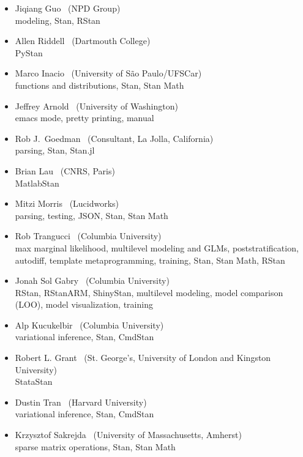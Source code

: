 \begin{itemize}
\\ {\footnotesize chief of optimization, code efficiency, matrix
  algebra, multivariate distributions, \Cpp, Stan, Stan Math, CmdStan}
\item Jiqiang Guo \   (NPD Group)
\\ {\footnotesize modeling, Stan, RStan}
\item Allen Riddell \   (Dartmouth College)
\\ {\footnotesize PyStan}
\item Marco Inacio \   (University of S\~{a}o Paulo/UFSCar)
\\ {\footnotesize functions and distributions, Stan, Stan Math}
\item Jeffrey Arnold \   (University of Washington)
\\ {\footnotesize emacs mode, pretty printing, manual}
\item Rob J.\ Goedman \ (Consultant, La Jolla, California)
\\ {\footnotesize parsing, Stan, Stan.jl}
\item Brian Lau \ (CNRS, Paris)
\\ {\footnotesize MatlabStan}
\item Mitzi Morris \   (Lucidworks)
\\ {\footnotesize parsing, testing, JSON, Stan, Stan Math}
\item Rob Trangucci \   (Columbia University)
\\ {\footnotesize max marginal likelihood, multilevel modeling and
  GLMs, poststratification, autodiff, template metaprogramming, 
  training, Stan, Stan Math, RStan}
\item Jonah Sol Gabry \ (Columbia University)
\\ {\footnotesize RStan, RStanARM, ShinyStan, multilevel modeling, 
  model comparison (LOO), model visualization, training}
\item Alp Kucukelbir \ (Columbia University)
\\ {\footnotesize variational inference, Stan, CmdStan}
\item Robert L. Grant \ (St. George's, University of London and
  Kingston University)
\\ {\footnotesize StataStan}
\item Dustin Tran \ (Harvard University)
\\ {\footnotesize variational inference, Stan, CmdStan}
\item Krzysztof Sakrejda \ (University of Massachusetts, Amherst)
\\ {\footnotesize sparse matrix operations, Stan, Stan Math}

\end{itemize}
